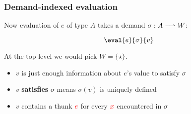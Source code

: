 \begin{frame}
\frametitle{Demand-indexed evaluation}

Now evaluation of $e$ of type $A$ takes a demand $\sigma : A \toFin W$:

\[\eval{e}{\sigma}{v}\]

At the top-level we would pick $W = \{\star\}$.

\begin{itemize}
\item \pause $v$ is just enough information about $e$'s value to satisfy
  $\sigma$
\item \pause $v$ \textbf{satisfies} $\sigma$ means $\sigma(v)$ is uniquely defined
\item \pause $v$ contains a thunk $\textcolor{red}{e}$ for every
  $\textcolor{red}{x}$ encountered in $\sigma$
\end{itemize}
\end{frame}
